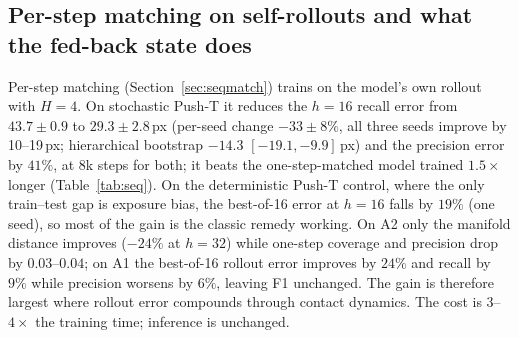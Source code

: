 \subsection{Per-step matching on self-rollouts and what the fed-back state does}
\label{sec:seq}
Per-step matching (Section~\ref{sec:seqmatch}) trains on the model's own rollout with $H{=}4$. On stochastic Push-T it reduces the $h{=}16$ recall error from $43.7 \pm 0.9$ to $29.3 \pm 2.8$\,px (per-seed change $-33 \pm 8\%$, all three seeds improve by 10--19\,px; hierarchical bootstrap $-14.3$ $[-19.1, -9.9]$\,px) and the precision error by $41\%$, at 8k steps for both; it beats the one-step-matched model trained $1.5\times$ longer (Table~\ref{tab:seq}). On the deterministic Push-T control, where the only train--test gap is exposure bias, the best-of-16 error at $h{=}16$ falls by $19\%$ (one seed), so most of the gain is the classic remedy working. On A2 only the manifold distance improves ($-24\%$ at $h{=}32$) while one-step coverage and precision drop by $0.03$--$0.04$; on A1 the best-of-16 rollout error improves by $24\%$ and recall by $9\%$ while precision worsens by $6\%$, leaving F1 unchanged. The gain is therefore largest where rollout error compounds through contact dynamics. The cost is $3$--$4\times$ the training time; inference is unchanged.

